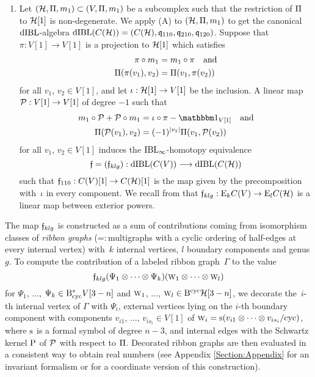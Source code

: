 \documentclass[\MainFolder/Text.tex]{subfiles}
\begin{document}
\begin{enumerate}[listparindent=\parindent,label=\textbf{(\Alph*)}]
 \item Let $(\mathcal{H},\Pi,m_1) \subset (V,\Pi,m_1)$ be a subcomplex such that the restriction of $\Pi$ to $\mathcal{H}[1]$ is non-degenerate. We apply (A) to $(\mathcal{H},\Pi,m_1)$ to get the canonical $\mathrm{dIBL}$-algebra $\mathrm{dIBL}(C(\mathcal{H})) = (C(\mathcal{H}),\mathfrak{q}_{110},\mathfrak{q}_{210},\mathfrak{q}_{120})$. 
Suppose that $\pi: V[1] \rightarrow V[1]$ is a projection to $\mathcal{H}[1]$ which satisfies
\begin{equation*}
 \begin{aligned}
 \pi \circ m_1 &= m_1 \circ \pi \quad\text{and}\\ \Pi(\pi(v_1),v_2) &= \Pi(v_1,\pi(v_2))
\end{aligned}
\end{equation*}
for all $v_1$, $v_2 \in V[1]$, and let $\iota: \mathcal{H}[1]\rightarrow V[1]$ be the inclusion. A linear map $\mathcal{P}: V[1]\rightarrow V[1]$ of degree $-1$ such that
\begin{equation}\label{Eq:ConditionOnG}
\begin{aligned}
m_1 \circ \Htp + \Htp \circ m_1 &= \iota\circ \pi - \Id_{V[1]}\quad\text{and} \\ 
\Pair(\Htp(v_1),v_2) &= (-1)^{\Abs{v_1}}\Pair(v_1,\Htp(v_2)) 
\end{aligned}
\end{equation}
for all $v_1$, $v_2 \in V[1]$ induces the $\mathrm{IBL}_\infty$-homotopy equivalence 
$$\mathfrak{f}=(\mathfrak{f}_{klg}): \mathrm{dIBL}(C(V)) \longrightarrow \mathrm{dIBL}(C(\mathcal{H})) $$
such that $\mathfrak{f}_{110}: C(V)[1] \rightarrow C(\mathcal{H})[1]$ is the map given by the precomposition with~$\iota$ in every component. We recall from \cite{Cieliebak2015} that $\mathfrak{f}_{klg}: \mathrm{E}_k C(V) \rightarrow \mathrm{E}_l C(\mathcal{H})$ is a linear map between exterior powers.
\end{enumerate}

The map $\mathfrak{f}_{klg}$ is constructed as a sum of contributions coming from isomorphism classes of \emph{ribbon graphs} (=:\,multigraphs with a cyclic ordering of half-edges at every internal vertex) with~$k$ internal vertices, $l$ boundary components and genus $g$. To compute the contribution of a labeled ribbon graph~$\Gamma$ to the value 
$$ \mathfrak{f}_{klg}(\Psi_1\otimes \dotsb \otimes \Psi_k)(\text{\footnotesize W}_1 \otimes \dotsb\otimes \text{\footnotesize W}_l)$$ 
for $\Psi_1$, $\dotsc$, $\Psi_k \in \mathrm{B}_{\mathrm{cyc}}^* V[3-n]$ and  $\text{\footnotesize W}_1$, $\dotsc$, $\text{\footnotesize W}_l\in \mathrm{B}^{\mathrm{cyc}} \mathcal{H} [3-n]$, we decorate the~$i$-th internal vertex of $\Gamma$ with $\Psi_i$, external vertices lying on the $i$-th boundary component with components $v_{i1}$, $\dotsc$, $v_{i s_i}\in V[1]$ of $\text{\footnotesize W}_i = \mathrm{s} (v_{i 1} \otimes \dotsb \otimes v_{i s_i} / \text{cyc})$, where $\mathrm{s}$ is a formal symbol of degree $n-3$, and internal edges with the Schwartz kernel $\mathrm{P}$ of $\mathcal{P}$ with respect to $\Pi$. Decorated ribbon graphs are then evaluated in a consistent way to obtain real numbers (see Appendix \ref{Section:Appendix} for an invariant formalism or \cite[Section 10]{Cieliebak2015} for a coordinate version of this construction).
\end{document}
